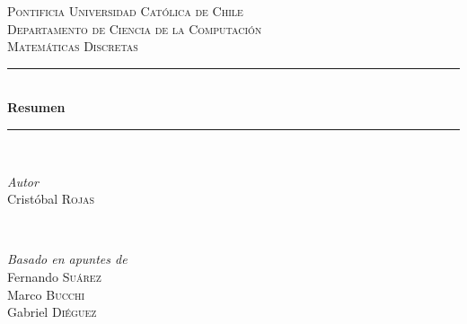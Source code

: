 \documentclass[letterpaper]{article}
\begin{document}

\begin{titlepage} %
    \newcommand{\HRule}{\rule{\linewidth}{0.5mm}} %

    \center %


    \textsc{\LARGE Pontificia Universidad Católica de Chile}\\[1.5cm] %

    \textsc{\Large Departamento de Ciencia de la Computación}\\[0.5cm] %

    \textsc{\large Matemáticas Discretas}\\[0.5cm] %


    \HRule\\[0.4cm]

    {\huge\bfseries Resumen}\\[0.4cm] %

    \HRule\\[1.5cm]


    \begin{minipage}{0.4\textwidth}
        \begin{flushleft}
            \large
            \textit{Autor}\\
            Cristóbal \textsc{Rojas} %
        \end{flushleft}
    \end{minipage}
    ~
    \begin{minipage}{0.4\textwidth}
        \begin{flushright}
            \large
            \textit{Basado en apuntes de}\\
            Fernando \textsc{Suárez} \\
            Marco \textsc{Bucchi} \\
            Gabriel \textsc{Diéguez}
        \end{flushright}
    \end{minipage}


\end{titlepage}
\end{document}
